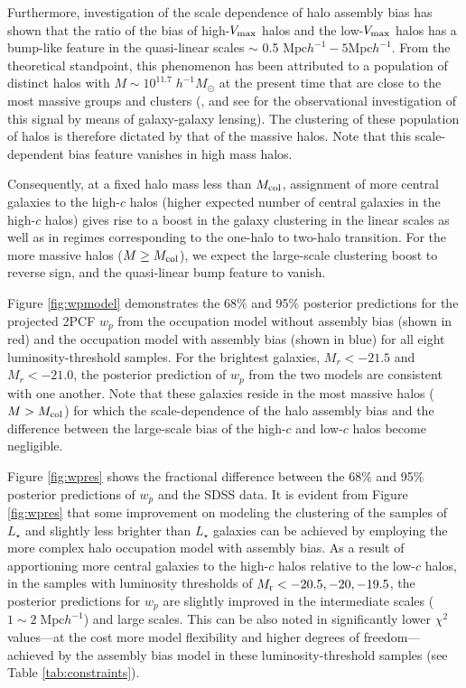 \documentclass[12pt, preprint]{aastex}
\begin{document}
Furthermore, investigation of the scale dependence of halo assembly bias has shown that the ratio of the bias of high-$V_{\rm max}$ halos and the low-$V_{\rm max}$ halos has a bump-like feature in the quasi-linear scales $\sim$ 0.5 $\mathrm{Mpc}h^{-1}-5\mathrm{Mpc}h^{-1}$. From the theoretical standpoint, this phenomenon has been attributed to a population of distinct halos with $M \sim 10^{11.7} \; h^{-1}M_{\odot}$ at the present time that are close to the most massive groups and clusters (\citealt{sunayama2016}, and see \citealt{more2016} for the observational investigation of this signal by means of galaxy-galaxy lensing). The clustering of these population of halos is therefore dictated by that of the massive halos. Note that this scale-dependent bias feature vanishes in high mass halos. 

Consequently, at a fixed halo mass less than $M_{\rm col}$, assignment of more central galaxies to the high-$c$ halos (higher expected number of central galaxies in the high-$c$ halos) gives rise to a boost in the galaxy clustering in the linear scales as well as in regimes corresponding to the one-halo to two-halo transition. For the more massive halos ($M \geq M_{\rm col}$), we expect the large-scale clustering boost to reverse sign, and the quasi-linear bump feature to vanish.  

Figure \ref{fig:wpmodel} demonstrates the 68$\%$ and 95$\%$ posterior predictions for the projected 2PCF $w_{p}$ from the occupation model without assembly bias (shown in red) and the occupation model with assembly bias (shown in blue) for all eight luminosity-threshold samples. For the brightest galaxies, $M_{r} < -21.5$ and $M_{r} < -21.0$, the posterior prediction of $w_{p}$ from the two models are consistent with one another. Note that these galaxies reside in the most massive halos ($M > M_{\rm col}$) for which the scale-dependence of the halo assembly bias and the difference between the large-scale bias of the high-$c$ and low-$c$ halos become negligible. 

Figure \ref{fig:wpres} shows the fractional difference between the 68$\%$ and 95$\%$ posterior predictions of $w_p$ and the SDSS data. It is evident from Figure \ref{fig:wpres} that some improvement on modeling the clustering of the samples of $L_{\star}$ and slightly less brighter than $L_{\star}$ galaxies can be achieved by employing the more complex halo occupation model with assembly bias. As a result of apportioning more central galaxies to the high-$c$ halos relative to the low-$c$ halos, in the samples with luminosity thresholds of $M_{\rm r}<-20.5, -20, -19.5$, the posterior predictions for $w_{p}$ are slightly improved in the intermediate scales ($1\sim 2 \; \mathrm{Mpc} h^{-1}$) and large scales. This can be also noted in significantly lower $\chi^{2}$ values---at the cost more model flexibility and higher degrees of freedom---achieved by the assembly bias model in these luminosity-threshold samples (see Table \ref{tab:constraints}).  
\end{document}
